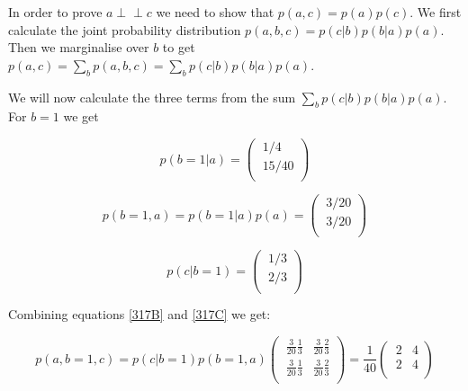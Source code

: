 \documentclass[11pt,a4paper,oneside]{report}
\newcommand\ci{\perp\!\!\!\perp} %
\begin{document}
In order to prove $a \ci c$ we need to show that $p(a,c) = p(a)p(c)$. We first 
calculate the joint probability distribution $p(a,b,c) = p(c|b)p(b|a)p(a)$. 
Then 
we marginalise over $b$ to get $p(a,c)=\sum_{b} p(a,b,c) = \sum_{b} 
p(c|b)p(b|a)p(a)$. 

We will now calculate the three terms from the sum $\sum_{b} 
p(c|b)p(b|a)p(a)$. For $b=1$ we get 


\begin{equation}
\label{317A}
p(b = 1|a) =  
  \begin{pmatrix}
   \ 1/4 \\[0.4em]
   \ 15/40 \\
 \end{pmatrix}
\end{equation}

 
\begin{equation}
\label{317B}
    p(b = 1, a) = p(b = 1|a) p(a) = \begin{pmatrix}
      \ 3/20 \\[0.4em]
      \ 3/20 \\
    \end{pmatrix}
\end{equation}

\begin{equation}
\label{317C}
p(c | b = 1) =  
  \begin{pmatrix}
   \ 1/3 \\[0.4em]
   \ 2/3 \\
 \end{pmatrix} 
\end{equation}

Combining equations \eqref{317B} and \eqref{317C} we get:

\begin{equation}
\label{317D}
p(a, b = 1, c) =  p(c | b = 1 )p(b = 1,a)
  \begin{pmatrix}
   \ \frac{3}{20} \frac{1}{3} & \frac{3}{20} \frac{2}{3} \\[0.4em]
   \ \frac{3}{20} \frac{1}{3} & \frac{3}{20} \frac{2}{3} \\
 \end{pmatrix} = \frac{1}{40}
  \begin{pmatrix}
   \ 2 & 4 \\[0.4em]
   \ 2 & 4 \\
 \end{pmatrix} 
\end{equation}
\end{document}
